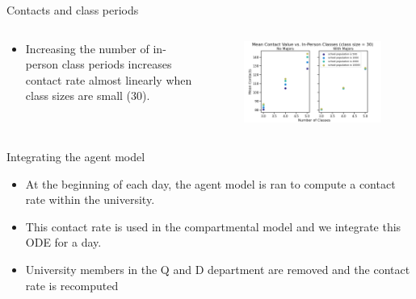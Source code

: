 \documentclass[aspectratio=169]{beamer}
\begin{document}
\begin{frame}{Contacts and class periods}
    \vfill
    \begin{columns}
    \begin{column}{.3\textwidth}
        \begin{itemize}
            \item Increasing the number of in-person class periods increases contact rate almost linearly when class sizes are small (30).
        \end{itemize}
    \end{column}
    \begin{column}{.7\textwidth}
        \begin{figure}[H]
            \centering
            \includegraphics[width=\textwidth]{figures/contacts_vs_periods.png}
        \end{figure}
    \end{column}
    \end{columns}
    \vfill
\end{frame}

\begin{frame}{Integrating the agent model}
    \vfill
    \begin{itemize}
    \pause
    \item At the beginning of each day, the agent model is ran to compute a contact rate within the university.
    \pause
    \item This contact rate is used in the compartmental model and we integrate this ODE for a day.
    \pause 
    \item University members in the Q and D department are removed and the contact rate is recomputed
    \end{itemize}
    \vfill
\end{frame}
\end{document}
